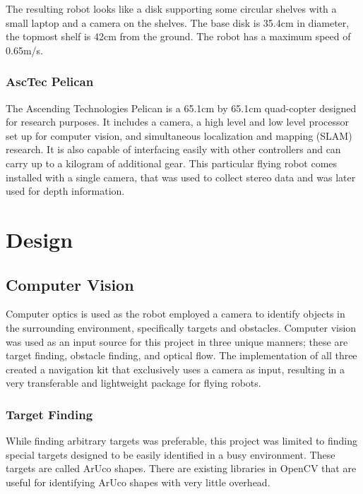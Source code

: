 \documentclass{article}[12]
\begin{document}
		The resulting robot looks like a disk supporting some circular shelves with a small laptop and a camera on the shelves. The base disk is 35.4cm in diameter, the topmost shelf is 42cm from the ground. The robot has a maximum speed of 0.65m/s. 
		
		\subsubsection{AscTec Pelican}
		
		The Ascending Technologies Pelican is a 65.1cm by 65.1cm quad-copter designed for research purposes\cite{asctec}. It includes a camera, a high level and low level processor set up for computer vision, and simultaneous localization and mapping (SLAM) research. It is also capable of interfacing easily with other controllers and can carry up to a kilogram of additional gear. This particular flying robot comes installed with a single camera, that was used to collect stereo data and was later used for depth information.

		
\section{Design}
	
	\subsection{Computer Vision}
	
	Computer optics is used as the robot employed a camera to identify objects in the surrounding environment, specifically targets and obstacles. Computer vision was used as an input source for this project in three unique manners; these are target finding, obstacle finding, and optical flow. The implementation of all three created a navigation kit that exclusively uses a camera as input, resulting in a very transferable and lightweight package for flying robots.
	
		\subsubsection{Target Finding}
		
		While finding arbitrary targets was preferable, this project was limited to finding special targets designed to be easily identified in a busy environment. These targets are called ArUco shapes. There are existing libraries in OpenCV that are useful for identifying ArUco shapes with very little overhead. 
		
\end{document}
